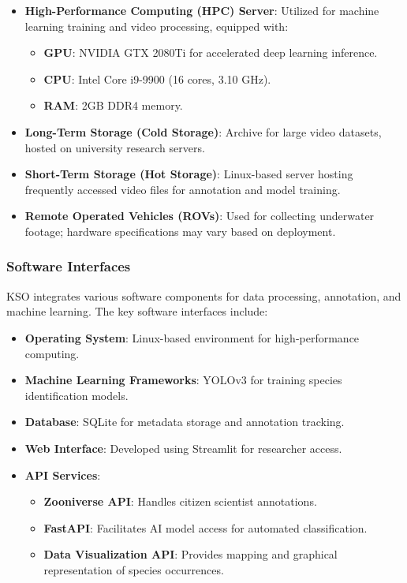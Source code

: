 \begin{itemize}
    \item \textbf{High-Performance Computing (HPC) Server}: Utilized for machine learning training and video processing, equipped with:
    \begin{itemize}
        \item \textbf{GPU}: NVIDIA GTX 2080Ti for accelerated deep learning inference.
        \item \textbf{CPU}: Intel Core i9-9900 (16 cores, 3.10 GHz).
        \item \textbf{RAM}: 2GB DDR4 memory.
    \end{itemize}
    \item \textbf{Long-Term Storage (Cold Storage)}: Archive for large video datasets, hosted on university research servers.
    \item \textbf{Short-Term Storage (Hot Storage)}: Linux-based server hosting frequently accessed video files for annotation and model training.
    \item \textbf{Remote Operated Vehicles (ROVs)}: Used for collecting underwater footage; hardware specifications may vary based on deployment.
\end{itemize}

\subsubsection{Software Interfaces}

KSO integrates various software components for data processing, annotation, and machine learning. The key software interfaces include:

\begin{itemize}
    \item \textbf{Operating System}: Linux-based environment for high-performance computing.
    \item \textbf{Machine Learning Frameworks}: YOLOv3 for training species identification models.
    \item \textbf{Database}: SQLite for metadata storage and annotation tracking.
    \item \textbf{Web Interface}: Developed using Streamlit for researcher access.
    \item \textbf{API Services}:
    \begin{itemize}
        \item \textbf{Zooniverse API}: Handles citizen scientist annotations.
        \item \textbf{FastAPI}: Facilitates AI model access for automated classification.
        \item \textbf{Data Visualization API}: Provides mapping and graphical representation of species occurrences.
    \end{itemize}
\end{itemize}

